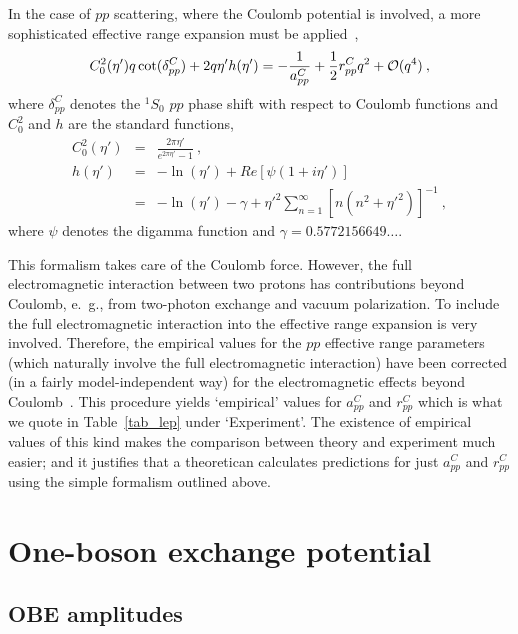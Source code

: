 In the case of $pp$ scattering, where 
the Coulomb potential is involved, a more sophisticated 
effective range expansion must be applied~\cite{Ber88},
\begin{equation}
C_0^2(\eta')q\cot(\delta^C_{pp}) + 2q\eta'h(\eta') =
-\frac{1}{a^C_{pp}} + \frac12 r^C_{pp} q^2 + {\cal O}(q^4)
\: ,
\end{equation}
where $\delta^C_{pp}$ denotes the $^1S_0$ $pp$ phase shift
with respect to Coulomb functions
and $C^2_0$ and $h$  are the standard functions,
\begin{eqnarray}
C^2_0 (\eta') & = & \frac{2\pi\eta'}{e^{2\pi\eta'}-1} \: ,\\
h(\eta') & = & -\ln(\eta') + Re[\psi(1+i\eta')] \\
         & = & -\ln(\eta') -\gamma + \eta'^2 \sum_{n=1}^\infty
[n(n^2+\eta'^2)]^{-1} \: ,
\end{eqnarray}
where $\psi$ denotes the digamma function and
$\gamma=0.5772156649\ldots$.

This formalism takes care of the Coulomb force. However, the full
electromagnetic interaction between two protons has contributions beyond
Coulomb, e.~g., from two-photon exchange and vacuum polarization.
To include the full electromagnetic interaction
into the effective range expansion
is very involved. 
Therefore, the empirical values for the $pp$ effective range parameters
(which naturally involve the full electromagnetic interaction) have been 
corrected (in a fairly model-independent way) 
for the electromagnetic effects beyond Coulomb~\cite{SES83,Ber88}. 
This procedure yields
`empirical' values for $a_{pp}^C$ and $r_{pp}^C$ which is what
we quote in Table~\ref{tab_lep} under `Experiment'.
The existence of empirical values of this kind makes the
comparison between theory and experiment much easier; and
it justifies that a theoretican calculates predictions for just
$a_{pp}^C$ and $r_{pp}^C$ using the simple formalism outlined above.





\section{One-boson exchange potential}

\subsection{OBE amplitudes}

